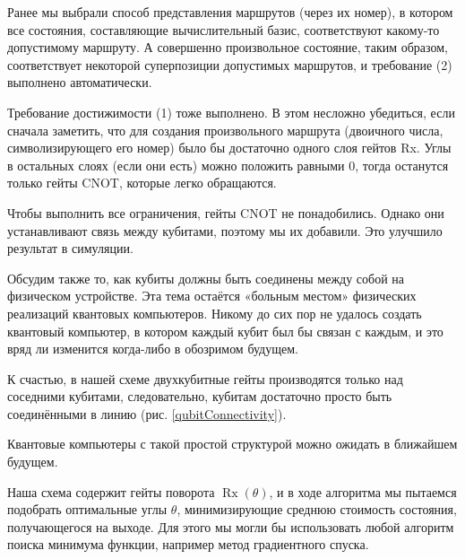 Ранее мы выбрали способ представления маршрутов (через их номер), в котором все состояния, составляющие вычислительный базис, соответствуют какому-то допустимому маршруту. А совершенно произвольное состояние, таким образом, соответствует некоторой суперпозиции допустимых маршрутов, и требование (2) выполнено автоматически.

Требование достижимости (1) тоже выполнено. В этом несложно убедиться, если сначала заметить, что для создания произвольного маршрута (двоичного числа, символизирующего его номер) было бы достаточно одного слоя гейтов Rx. Углы в остальных слоях (если они есть) можно положить равными 0, тогда останутся только гейты CNOT, которые легко обращаются.


Чтобы выполнить все ограничения, гейты CNOT не понадобились. Однако они устанавливают связь между кубитами, поэтому мы их добавили. Это улучшило результат в симуляции.

Обсудим также то, как кубиты должны быть соединены между собой на физическом устройстве. 
Эта тема остаётся «больным местом» 
физических реализаций квантовых компьютеров. Никому до сих пор не удалось создать квантовый компьютер, в котором каждый кубит был бы связан с каждым, и это вряд ли изменится когда-либо в обозримом будущем.

К счастью, в нашей схеме двухкубитные гейты производятся только над соседними кубитами, следовательно, кубитам достаточно просто быть соединёнными в линию (рис. \ref{qubitConnectivity}).

\vspace{0.2em}


Квантовые компьютеры с такой простой структурой можно ожидать в ближайшем будущем.



Наша схема содержит гейты поворота $\operatorname{Rx}(\theta)$, и в ходе алгоритма мы пытаемся подобрать оптимальные углы $\theta$, минимизирующие среднюю стоимость состояния, получающегося на выходе. Для этого мы могли бы использовать любой алгоритм поиска минимума функции, например метод градиентного спуска.

